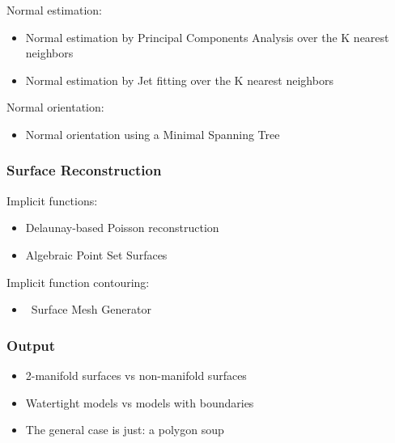 Normal estimation:

\begin{itemize}
\item Normal estimation by Principal Components Analysis over the K nearest neighbors
\item Normal estimation by Jet fitting over the K nearest neighbors
\end{itemize}

Normal orientation:

\begin{itemize}
\item Normal orientation using a Minimal Spanning Tree \cite{cgal:hddms-srup-92}
\end{itemize}


\subsubsection{Surface Reconstruction}

Implicit functions:

\begin{itemize}
\item Delaunay-based Poisson reconstruction \cite{Kazhdan06}
\item Algebraic Point Set Surfaces \cite{Guennebaud07}
\end{itemize}

Implicit function contouring:

\begin{itemize}
\item \cgal\ Surface Mesh Generator~\cite{cgal:ry-gsddrm-06,cgal:bo-pgsms-05}
\end{itemize}


\subsubsection{Output}

\begin{itemize}
\item 2-manifold surfaces vs non-manifold surfaces
\item Watertight models vs models with boundaries
\item The general case is just: a polygon soup
\end{itemize}


